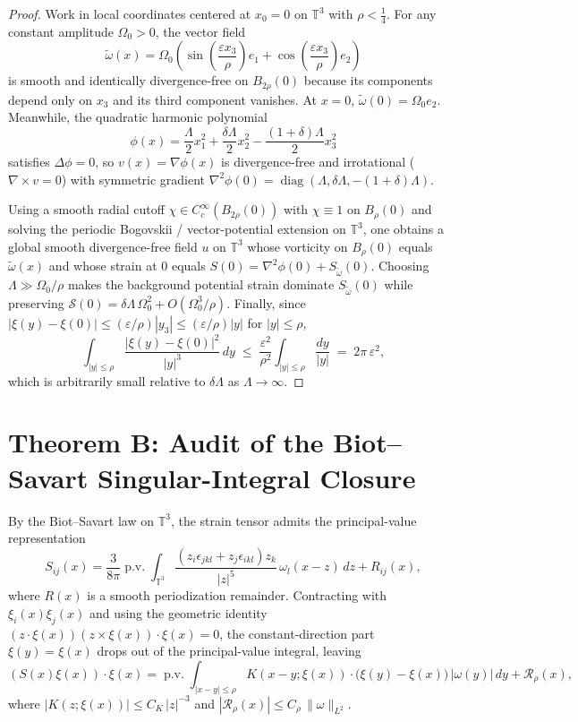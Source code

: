 \documentclass[11pt]{amsart}
\theoremstyle{definition}
\begin{document}
\begin{proof}
Work in local coordinates centered at $x_0=0$ on $\mathbb{T}^3$ with $\rho<\tfrac{1}{4}$. For any constant amplitude $\Omega_0>0$, the vector field
\[
  \widetilde{\omega}(x)=\Omega_0\left(\sin\!\left(\frac{\varepsilon x_3}{\rho}\right)e_1+\cos\!\left(\frac{\varepsilon x_3}{\rho}\right)e_2\right)
\]
is smooth and identically divergence-free on $B_{2\rho}(0)$ because its components depend only on $x_3$ and its third component vanishes. At $x=0$, $\widetilde{\omega}(0)=\Omega_0 e_2$. Meanwhile, the quadratic harmonic polynomial
\[
  \phi(x)=\frac{\Lambda}{2}x_1^2+\frac{\delta\Lambda}{2}x_2^2-\frac{(1+\delta)\Lambda}{2}x_3^2
\]
satisfies $\Delta\phi=0$, so $v(x)=\nabla\phi(x)$ is divergence-free and irrotational ($\nabla\times v=0$) with symmetric gradient $\nabla^2\phi(0)=\operatorname{diag}(\Lambda,\delta\Lambda,-(1+\delta)\Lambda)$.

Using a smooth radial cutoff $\chi\in C_c^\infty(B_{2\rho}(0))$ with $\chi\equiv 1$ on $B_\rho(0)$ and solving the periodic Bogovskii / vector-potential extension on $\mathbb{T}^3$, one obtains a global smooth divergence-free field $u$ on $\mathbb{T}^3$ whose vorticity on $B_\rho(0)$ equals $\widetilde{\omega}(x)$ and whose strain at $0$ equals $S(0)=\nabla^2\phi(0)+S_{\widetilde{\omega}}(0)$. Choosing $\Lambda\gg \Omega_0/\rho$ makes the background potential strain dominate $S_{\widetilde{\omega}}(0)$ while preserving $\mathcal{S}(0)=\delta\Lambda\,\Omega_0^2+O(\Omega_0^3/\rho)$. Finally, since $|\xi(y)-\xi(0)|\le (\varepsilon/\rho)|y_3|\le (\varepsilon/\rho)|y|$ for $|y|\le\rho$,
\[
  \int_{|y|\le\rho}\frac{|\xi(y)-\xi(0)|^2}{|y|^3}\,dy
  \;\le\;\frac{\varepsilon^2}{\rho^2}\int_{|y|\le\rho}\frac{dy}{|y|}
  \;=\;2\pi\,\varepsilon^2,
\]
which is arbitrarily small relative to $\delta\Lambda$ as $\Lambda\to\infty$.
\end{proof}

\section{Theorem B: Audit of the Biot--Savart Singular-Integral Closure}

By the Biot--Savart law on $\mathbb{T}^3$, the strain tensor admits the principal-value representation
\[
  S_{ij}(x)=\frac{3}{8\pi}\operatorname{p.v.}\int_{\mathbb{T}^3}
  \frac{(z_i\epsilon_{jkl}+z_j\epsilon_{ikl})z_k}{|z|^5}\,\omega_l(x-z)\,dz + R_{ij}(x),
\]
where $R(x)$ is a smooth periodization remainder. Contracting with $\xi_i(x)\xi_j(x)$ and using the geometric identity $(z\cdot\xi(x))(z\times\xi(x))\cdot\xi(x)=0$, the constant-direction part $\xi(y)=\xi(x)$ drops out of the principal-value integral, leaving
\[
  (S(x)\xi(x))\cdot\xi(x)
  = \operatorname{p.v.}\int_{|x-y|\le\rho} K(x-y;\xi(x))\cdot\bigl(\xi(y)-\xi(x)\bigr)\,|\omega(y)|\,dy + \mathcal{R}_\rho(x),
\]
where $|K(z;\xi(x))|\le C_K\,|z|^{-3}$ and $|\mathcal{R}_\rho(x)|\le C_\rho\,\|\omega\|_{L^2}$.
\end{document}
